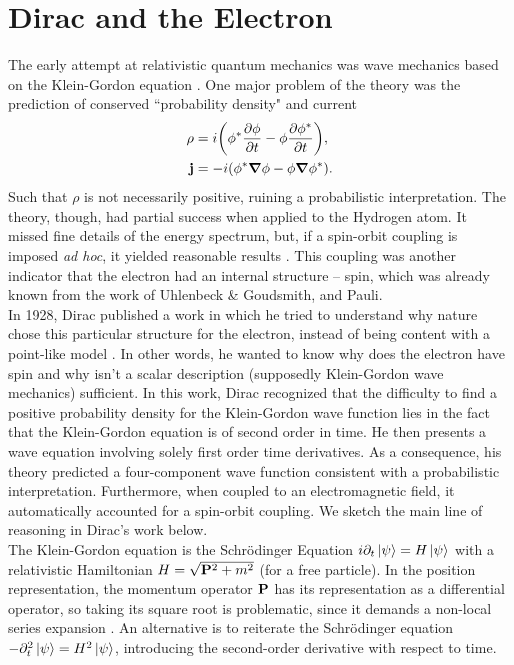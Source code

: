 \chapter{Dirac and the Electron}
The early attempt at relativistic quantum mechanics was wave mechanics based on the Klein-Gordon equation \cite{weinberg1995quantum}. One major problem of the theory was the prediction of conserved ``probability density" and current \cite{weinberg1995quantum,alvarez2011invitation,lancaster2014quantum} 
\begin{equation}
    \begin{aligned}
    \rho&={i}\qty(\phi^*\pdv{\phi}{t}-\phi\pdv{\phi^*}{t}),\\
    \vb{j}&=-i(\phi^*\grad\phi-\phi\grad\phi^*).
    \end{aligned}
\end{equation}
Such that $\rho$ is not necessarily positive, ruining a probabilistic interpretation. The theory, though, had partial success when applied to the Hydrogen atom. It missed fine details of the energy spectrum, but, if a spin-orbit coupling is imposed \textit{ad hoc}, it yielded reasonable results \cite{weinberg1995quantum}. This coupling was another indicator that the electron had an internal structure -- spin, which was already known from the work of Uhlenbeck \& Goudsmith, and Pauli.\\

In 1928, Dirac published a work in which he tried to understand why nature chose this particular structure for the electron, instead of being content with a point-like model \cite{dirac28}. In other words, he wanted to know why does the electron have spin and why isn't a scalar description (supposedly Klein-Gordon wave mechanics) sufficient. In this work, Dirac recognized that the difficulty to find a positive probability density for the Klein-Gordon wave function lies in the fact that the Klein-Gordon equation is of second order in time. He then presents a wave equation
involving solely first order time derivatives. As a consequence, his theory predicted a four-component wave function consistent with a probabilistic interpretation. Furthermore, when coupled to an electromagnetic field, it automatically accounted for a spin-orbit coupling. We sketch the main line of reasoning in Dirac's work below.\\

The Klein-Gordon equation is the Schrödinger Equation $i\partial_t\ket{\psi}=H\ket{\psi}$ with a relativistic Hamiltonian $H=\sqrt{\vb{P}^2+m^2}$ (for a free particle). In the position representation, the momentum operator $\vb{P}$ has its representation as a differential operator, so taking its square root is problematic, since it demands a non-local series expansion \cite{srednicki2007quantum}. An alternative is to reiterate the Schrödinger equation $-\partial^2_t\ket{\psi}=H^2\ket{\psi}$, introducing the second-order derivative with respect to time.\\

